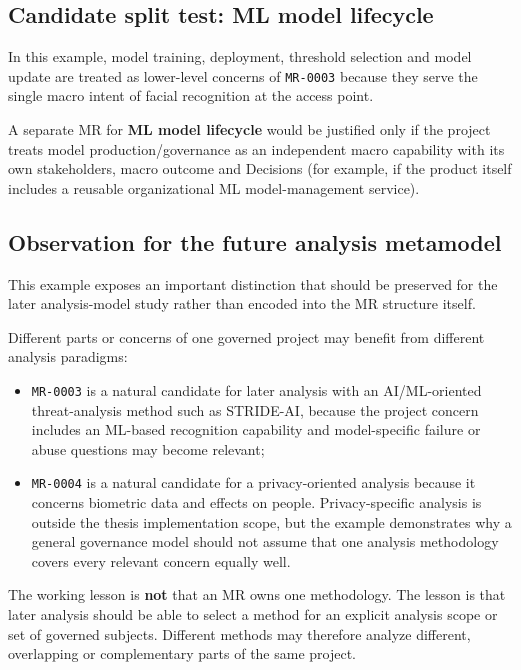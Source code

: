 \documentclass[
  10pt,
]{article}
\providecommand{\tightlist}{%
  \setlength{\itemsep}{0pt}\setlength{\parskip}{0pt}}
\begin{document}
\subsection{Candidate split test: ML model
lifecycle}\label{candidate-split-test-ml-model-lifecycle}

In this example, model training, deployment, threshold selection and
model update are treated as lower-level concerns of \texttt{MR-0003}
because they serve the single macro intent of facial recognition at the
access point.

A separate MR for \textbf{ML model lifecycle} would be justified only if
the project treats model production/governance as an independent macro
capability with its own stakeholders, macro outcome and Decisions (for
example, if the product itself includes a reusable organizational ML
model-management service).

\subsection{Observation for the future analysis
metamodel}\label{observation-for-the-future-analysis-metamodel}

This example exposes an important distinction that should be preserved
for the later analysis-model study rather than encoded into the MR
structure itself.

Different parts or concerns of one governed project may benefit from
different analysis paradigms:

\begin{itemize}
\tightlist
\item
  \texttt{MR-0003} is a natural candidate for later analysis with an
  AI/ML-oriented threat-analysis method such as STRIDE-AI, because the
  project concern includes an ML-based recognition capability and
  model-specific failure or abuse questions may become relevant;
\item
  \texttt{MR-0004} is a natural candidate for a privacy-oriented
  analysis because it concerns biometric data and effects on people.
  Privacy-specific analysis is outside the thesis implementation scope,
  but the example demonstrates why a general governance model should not
  assume that one analysis methodology covers every relevant concern
  equally well.
\end{itemize}

The working lesson is \textbf{not} that an MR owns one methodology. The
lesson is that later analysis should be able to select a method for an
explicit analysis scope or set of governed subjects. Different methods
may therefore analyze different, overlapping or complementary parts of
the same project.
\end{document}
